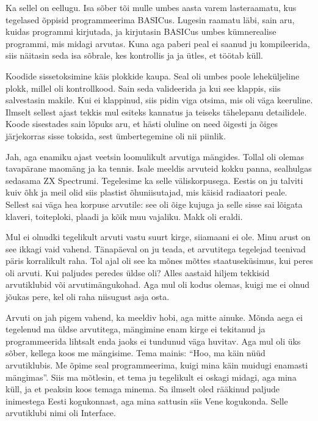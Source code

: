 
Ka sellel on eellugu. Isa sõber tõi mulle umbes aasta varem lasteraamatu, kus tegelased õppisid programmeerima 
BASICus. Lugesin raamatu läbi, sain aru, kuidas 
programmi kirjutada, ja kirjutasin BASICus umbes kümnerealise programmi, mis 
midagi arvutas. Kuna aga paberi peal ei saanud ju
kompileerida, siis näitasin seda isa sõbrale, kes kontrollis ja  
ja ütles, et töötab küll.

Koodide sissetoksimine käis plokkide kaupa. Seal oli 
umbes poole leheküljeline plokk, millel oli kontrollkood. Sain seda 
valideerida ja kui see klappis, siis salvestasin makile. 
Kui ei klappinud, siis pidin viga otsima, mis oli väga 
keeruline. Ilmselt sellest ajast tekkis mul esiteks 
kannatus ja teiseks tähelepanu detailidele. Koode sisestades sain
lõpuks aru, et hästi oluline on need õigesti ja õiges 
järjekorras sisse toksida, sest ümbertegemine oli nii piinlik.



Jah, aga enamiku ajast veetsin loomulikult arvutiga mängides. Tollal 
oli olemas tavapärane maomäng ja ka tennis. Isale meeldis arvuteid kokku panna, sealhulgas sedasama 
ZX Spectrumi. Tegelesime ka 
selle väliskorpusega. Eestis on ju talviti kuiv õhk ja 
meil olid siis plastist õhuniisutajad, mis käisid radiaatori peale. Sellest sai väga 
hea korpuse arvutile: see oli õige kujuga ja selle sisse sai lõigata 
klaveri, toiteploki, plaadi ja kõik muu vajaliku. Makk oli eraldi.


Mul ei olnudki tegelikult arvuti vastu suurt kirge, siiamaani ei ole. Minu arust on see ikkagi vaid vahend. Tänapäeval on ju
teada, et arvutitega tegelejad teenivad päris korralikult raha. Tol ajal oli see ka mõnes mõttes staatuseküsimus, kui peres oli
arvuti. Kui paljudes peredes
üldse oli? Alles aastaid hiljem tekkisid arvutiklubid või
arvutimängukohad. Aga mul oli kodus olemas, kuigi me ei olnud
jõukas pere, kel oli raha niisugust asja osta. 

Arvuti on jah pigem vahend, ka meeldiv hobi, aga mitte ainuke. Mõnda aega ei tegelenud ma üldse arvutitega, 
mängimine enam kirge ei tekitanud ja programmeerida lihtsalt enda jaoks ei
tundunud väga huvitav. Aga mul oli üks sõber, kellega koos me mängisime. Tema
mainis: \enquote{Hoo, ma käin nüüd arvutiklubis. Me õpime seal programmeerima,
kuigi mina käin muidugi enamasti mängimas}. Siis ma mõtlesin, et tema ju
tegelikult ei oskagi midagi, aga mina küll, ja et peaksin koos temaga minema. Sa
ilmselt oled rääkinud paljude inimestega Eesti kogukonnast, aga mina sattusin
siis Vene kogukonda. Selle arvutiklubi nimi oli Interface.


